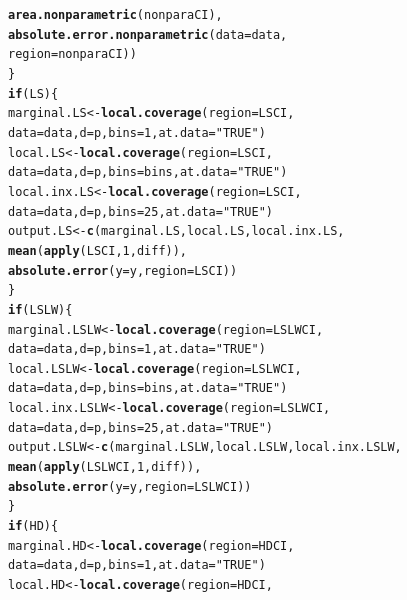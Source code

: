 \documentclass[11pt]{article}\usepackage[]{graphicx}\usepackage[]{color}
\makeatletter
\newcommand{\hlnum}[1]{\textcolor[rgb]{0.686,0.059,0.569}{#1}}%
\newcommand{\hlstr}[1]{\textcolor[rgb]{0.192,0.494,0.8}{#1}}%
\newcommand{\hlstd}[1]{\textcolor[rgb]{0.345,0.345,0.345}{#1}}%
\newcommand{\hlkwa}[1]{\textcolor[rgb]{0.161,0.373,0.58}{\textbf{#1}}}%
\newcommand{\hlkwb}[1]{\textcolor[rgb]{0.69,0.353,0.396}{#1}}%
\newcommand{\hlkwc}[1]{\textcolor[rgb]{0.333,0.667,0.333}{#1}}%
\newcommand{\hlkwd}[1]{\textcolor[rgb]{0.737,0.353,0.396}{\textbf{#1}}}%
\newenvironment{kframe}{%
 \def\at@end@of@kframe{}%
 \ifinner\ifhmode%
  \def\at@end@of@kframe{\end{minipage}}%
  \begin{minipage}{\columnwidth}%
 \fi\fi%
 \def\FrameCommand##1{\hskip\@totalleftmargin \hskip-\fboxsep
 \colorbox{shadecolor}{##1}\hskip-\fboxsep
     \hskip-\linewidth \hskip-\@totalleftmargin \hskip\columnwidth}%
 \MakeFramed {\advance\hsize-\width
   \@totalleftmargin\z@ \linewidth\hsize
   \@setminipage}}%
 {\par\unskip\endMakeFramed%
 \at@end@of@kframe}
\newenvironment{knitrout}{}{} %
\makeatother
\begin{document}
\begin{knitrout}
\begin{kframe}
\begin{alltt}
        \hlkwd{area.nonparametric}\hlstd{(nonparaCI),}
        \hlkwd{absolute.error.nonparametric}\hlstd{(}\hlkwc{data} \hlstd{= data,}
          \hlkwc{region} \hlstd{= nonparaCI))}
  \hlstd{\}}
  \hlkwa{if}\hlstd{(LS)\{}
    \hlstd{marginal.LS} \hlkwb{<-} \hlkwd{local.coverage}\hlstd{(}\hlkwc{region} \hlstd{= LSCI,}
      \hlkwc{data} \hlstd{= data,} \hlkwc{d} \hlstd{= p,} \hlkwc{bins} \hlstd{=} \hlnum{1}\hlstd{,} \hlkwc{at.data} \hlstd{=} \hlstr{"TRUE"}\hlstd{)}
    \hlstd{local.LS} \hlkwb{<-} \hlkwd{local.coverage}\hlstd{(}\hlkwc{region} \hlstd{= LSCI,}
      \hlkwc{data} \hlstd{= data,} \hlkwc{d} \hlstd{= p,} \hlkwc{bins} \hlstd{= bins,} \hlkwc{at.data} \hlstd{=} \hlstr{"TRUE"}\hlstd{)}
    \hlstd{local.inx.LS} \hlkwb{<-} \hlkwd{local.coverage}\hlstd{(}\hlkwc{region} \hlstd{= LSCI,}
      \hlkwc{data} \hlstd{= data,} \hlkwc{d} \hlstd{= p,} \hlkwc{bins} \hlstd{=} \hlnum{25}\hlstd{,} \hlkwc{at.data} \hlstd{=} \hlstr{"TRUE"}\hlstd{)}
    \hlstd{output.LS} \hlkwb{<-} \hlkwd{c}\hlstd{(marginal.LS, local.LS, local.inx.LS,}
      \hlkwd{mean}\hlstd{(}\hlkwd{apply}\hlstd{(LSCI,} \hlnum{1}\hlstd{, diff)),}
      \hlkwd{absolute.error}\hlstd{(}\hlkwc{y} \hlstd{= y,} \hlkwc{region} \hlstd{= LSCI))}
  \hlstd{\}}
  \hlkwa{if}\hlstd{(LSLW)\{}
    \hlstd{marginal.LSLW} \hlkwb{<-} \hlkwd{local.coverage}\hlstd{(}\hlkwc{region} \hlstd{= LSLWCI,}
      \hlkwc{data} \hlstd{= data,} \hlkwc{d} \hlstd{= p,} \hlkwc{bins} \hlstd{=} \hlnum{1}\hlstd{,} \hlkwc{at.data} \hlstd{=} \hlstr{"TRUE"}\hlstd{)}
    \hlstd{local.LSLW} \hlkwb{<-} \hlkwd{local.coverage}\hlstd{(}\hlkwc{region} \hlstd{= LSLWCI,}
      \hlkwc{data} \hlstd{= data,} \hlkwc{d} \hlstd{= p,} \hlkwc{bins} \hlstd{= bins,} \hlkwc{at.data} \hlstd{=} \hlstr{"TRUE"}\hlstd{)}
    \hlstd{local.inx.LSLW} \hlkwb{<-} \hlkwd{local.coverage}\hlstd{(}\hlkwc{region} \hlstd{= LSLWCI,}
      \hlkwc{data} \hlstd{= data,} \hlkwc{d} \hlstd{= p,} \hlkwc{bins} \hlstd{=} \hlnum{25}\hlstd{,} \hlkwc{at.data} \hlstd{=} \hlstr{"TRUE"}\hlstd{)}
    \hlstd{output.LSLW} \hlkwb{<-} \hlkwd{c}\hlstd{(marginal.LSLW, local.LSLW, local.inx.LSLW,}
      \hlkwd{mean}\hlstd{(}\hlkwd{apply}\hlstd{(LSLWCI,} \hlnum{1}\hlstd{, diff)),}
      \hlkwd{absolute.error}\hlstd{(}\hlkwc{y} \hlstd{= y,} \hlkwc{region} \hlstd{= LSLWCI))}
  \hlstd{\}}
  \hlkwa{if}\hlstd{(HD)\{}
    \hlstd{marginal.HD} \hlkwb{<-} \hlkwd{local.coverage}\hlstd{(}\hlkwc{region} \hlstd{= HDCI,}
      \hlkwc{data} \hlstd{= data,} \hlkwc{d} \hlstd{= p,} \hlkwc{bins} \hlstd{=} \hlnum{1}\hlstd{,} \hlkwc{at.data} \hlstd{=} \hlstr{"TRUE"}\hlstd{)}
    \hlstd{local.HD} \hlkwb{<-} \hlkwd{local.coverage}\hlstd{(}\hlkwc{region} \hlstd{= HDCI,}

\end{alltt}
\end{kframe}
\end{knitrout}
\end{document}
